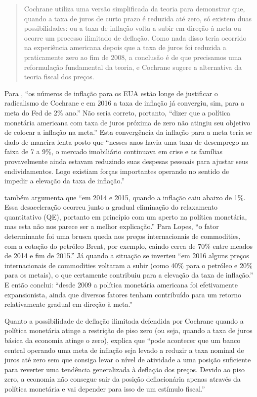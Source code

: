 \documentclass[]{article}
\begin{document}
\begin{quote}
Cochrane utiliza uma versão simplificada da teoria para demonstrar que,
quando a taxa de juros de curto prazo é reduzida até zero, só existem
duas possibilidades: ou a taxa de inflação volta a subir em direção à
meta ou ocorre um processo ilimitado de deflação. Como nada disso teria
ocorrido na experiência americana depois que a taxa de juros foi
reduzida a praticamente zero ao fim de 2008, a conclusão é de que
precisamos uma reformulação fundamental da teoria, e Cochrane sugere a
alternativa da teoria fiscal dos preços.
\end{quote}

Para  , ``os números de inflação para os EUA
estão longe de justificar o radicalismo de Cochrane e em 2016 a taxa de
inflação já convergiu, sim, para a meta do Fed de 2\% ano.'' Não seria
correto, portanto, ``dizer que a política monetária americana com taxa
de juros próxima de zero não atingiu seu objetivo de colocar a inflação
na meta.'' Esta convergência da inflação para a meta teria se dado de
maneira lenta posto que ``nesses anos havia uma taxa de desemprego na
faixa de 7 a 9\%, o mercado imobiliário continuava em crise e as
famílias provavelmente ainda estavam reduzindo suas despesas pessoais
para ajustar seus endividamentos. Logo existiam forças importantes
operando no sentido de impedir a elevação da taxa de inflação.''

 também argumenta que ``em 2014 e 2015, quando a
inflação caiu abaixo de 1\%. Essa desaceleração ocorreu junto a gradual
eliminação do relaxamento quantitativo (QE), portanto em princípio com
um aperto na política monetária, mas esta não nos parece ser a melhor
explicação.'' Para Lopes, ``o fator determinante foi uma brusca queda
nos preços internacionais de commodities, com a cotação do petróleo
Brent, por exemplo, caindo cerca de 70\% entre meados de 2014 e fim de
2015.'' Já quando a situação se inverteu ``em 2016 alguns preços
internacionais de commodities voltaram a subir (como 40\% para o
petróleo e 20\% para os metais), o que certamente contribuiu para a
elevação da taxa de inflação.'' E então conclui: ``desde 2009 a política
monetária americana foi efetivamente expansionista, ainda que diversos
fatores tenham contribuído para um retorno relativamente gradual em
direção à meta.''

Quanto a possibilidade de deflação ilimitada defendida por Cochrane
quando a política monetária atinge a restrição de piso zero (ou seja,
quando a taxa de juros básica da economia atinge o zero),
 explica que ``pode acontecer que um banco
central operando uma meta de inflação seja levado a reduzir a taxa
nominal de juros até zero sem que consiga levar o nível de atividade a
uma posição suficiente para reverter uma tendência generalizada à
deflação dos preços. Devido ao piso zero, a economia não consegue sair
da posição deflacionária apenas através da política monetária e vai
depender para isso de um estímulo fiscal.''
\end{document}
